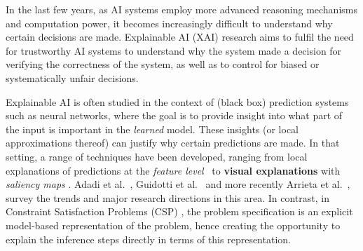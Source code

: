 

In the last few years, as AI systems employ more advanced reasoning mechanisms and computation power, it becomes increasingly difficult to understand why certain decisions are made. 
Explainable AI (XAI) research aims to fulfil the need for trustworthy AI systems to understand why the system made a decision for verifying the correctness of the system, as well as to control for biased or systematically unfair decisions.

Explainable AI is often studied in the context of (black box) prediction systems such as neural networks, where the goal is to provide insight into what part of the input is important in the \textit{learned} model. 
These insights (or local approximations thereof) can justify why certain predictions are made. 
In that setting, a range of techniques have been developed, ranging from local explanations of predictions at the \textit{feature level}~\cite{ribeiro2016should,lundberg2017unified} to \textbf{visual explanations} with \textit{saliency maps} \cite{selvaraju2017grad}. %
Adadi et al.~\cite{Adadi_2018}, Guidotti et al.~\cite{guidotti2018survey} and more recently Arrieta et al.~\cite{Barredo_Arrieta_2020}, survey the trends and  major research directions in this area.
In contrast, in Constraint Satisfaction Problems (CSP) \cite{fai/Rossi06}, the problem specification is an explicit model-based representation of the problem, hence creating the opportunity to explain the inference steps directly in terms of this representation.





